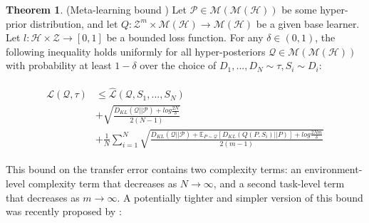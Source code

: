 \documentclass{article}
\theoremstyle{definition}
\newtheorem{theorem}{Theorem}[section]
\newcommand{\Expect}[2]{\mathbb{E}_{#1}\left [#2 \right ]}
\begin{document}
\begin{theorem} (Meta-learning bound \citep{Amit2018}) \label{thm:meta-pb}
	Let $\mathcal{P}\in \mathcal{M}(\mathcal{M}(\mathcal{H}))$ be some hyper-prior distribution, and let $Q: \mathcal{Z}^m\times\mathcal{M}(\mathcal{H})\rightarrow \mathcal{M}(\mathcal{H})$ be a given base learner. Let $l: \mathcal{H}\times \mathcal{Z}\rightarrow [0, 1]$ be a bounded loss function.
	For any $\delta \in (0,1)$, the following inequality holds uniformly for all hyper-posteriors $\mathcal{Q}\in \mathcal{M}(\mathcal{M}(\mathcal{H}))$ with probability at least $1-\delta$ over the choice of $D_1,...,D_N\sim \tau, S_i\sim D_i$:
	
	\begin{align} \label{eq:meta-pb-amit}
	\begin{split}
	\mathcal{L}(\mathcal{Q}, \tau) &\leq \hat{\mathcal{L}}(\mathcal{Q}, S_1,...,S_N) \\
	&+\sqrt{\frac{D_{KL}(\mathcal{Q}||\mathcal{P})+log\frac{2N}{\delta}}{2(N-1)}} \\
	&+\frac{1}{N}\sum_{i=1}^{N}\sqrt{\frac{D_{KL}(\mathcal{Q}||\mathcal{P})+\Expect{P\sim \mathcal{Q}}{D_{KL}(Q(P,S_i)||P)}+log\frac{2Nm}{\delta}}{2(m-1)}}
	\end{split}
	\end{align}
	
\end{theorem}

This bound on the transfer error contains two complexity terms: an environment-level complexity term that decreases as $N\rightarrow \infty$, and a second task-level term that decreases as $m\rightarrow \infty$. A potentially tighter and simpler version of this bound was recently proposed by \cite{Rothfuss2020}:
\end{document}
